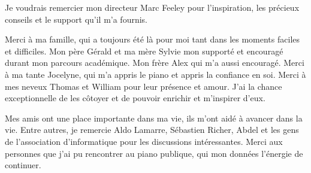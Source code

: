 \documentclass[12pt,maitrise]{dms}
\theoremstyle{definition}
\numberwithin{equation}{section}
\numberwithin{table}{chapter}
\numberwithin{figure}{chapter}
\begin{document}
Je voudrais remercier mon directeur Marc Feeley pour l'inspiration,
les précieux conseils et le support qu'il m'a fournis.

Merci à ma famille, qui a toujours été là pour moi tant dans les moments
faciles et difficiles. Mon père Gérald et ma mère Sylvie mon supporté et
encouragé durant mon parcours académique. Mon frère Alex qui m'a aussi
encouragé. Merci à ma tante Jocelyne, qui m'a appris le piano et appris la
confiance en soi.  Merci à mes neveux Thomas et William pour leur présence et
amour. J'ai la chance exceptionnelle de les côtoyer et de pouvoir enrichir et
m'inspirer d'eux.

Mes amis ont une place importante dans ma vie, ils m'ont aidé
à avancer dans la vie. Entre autres, je remercie Aldo Lamarre,
Sébastien Richer, Abdel et les gens de l'association d'informatique
pour les discussions intéressantes. Merci aux personnes que j'ai
pu rencontrer au piano publique, qui mon données l'énergie de
continuer.


\NoChapterPageNumber%
\cleardoublepage


%




%






\newpage


\end{document}
